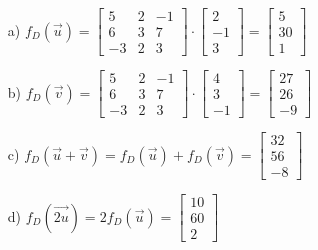 \begin{itemize}
\item[a) ]	$f_{D}(\vec{u}) =	\begin{bmatrix}	5	&	2	&	-1	\\6	&	3	&	7	\\-3	&	2	&	3\end{bmatrix}\cdot\begin{bmatrix}2\\-1\\3	\end{bmatrix}=\begin{bmatrix}5 \\30 \\1\end{bmatrix} $
				
\item[b) ]	$f_{D}(\vec{v}) =\begin{bmatrix}5	&	2	&	-1	\\6	&	3	&	7	\\-3	&	2	&	3\end{bmatrix} \cdot\begin{bmatrix}4 \\3\\-1	\end{bmatrix}=\begin{bmatrix}27\\26\\-9\end{bmatrix} $

\item[c) ]	$f_{D}(\vec{u} + \vec{v})=f_{D}(\vec{u}) + f_{D}(\vec{v})=\begin{bmatrix}32\\56\\-8\end{bmatrix}$

\item[d) ]	$f_{D}(\vec{2u})=2f_{D}(\vec{u})=\begin{bmatrix}10 \\60 \\2\end{bmatrix}$
\end{itemize}